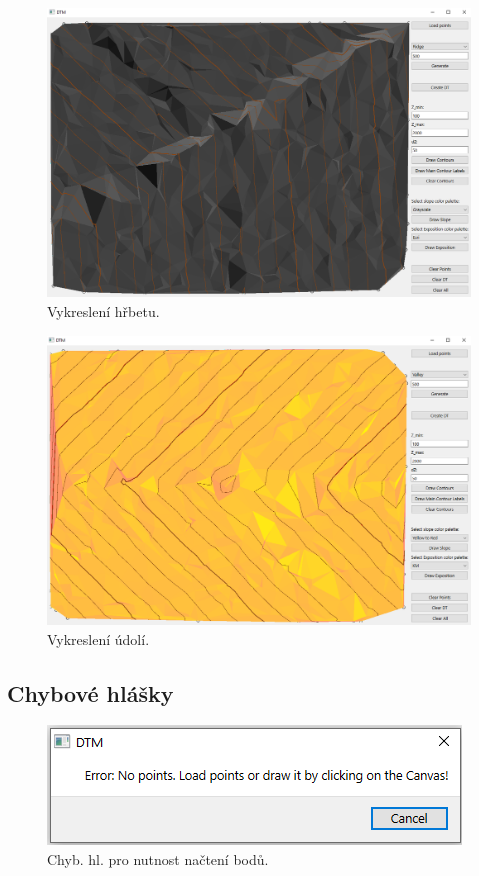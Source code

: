 \documentclass[a4paper, 12pt, oneside, titlepage]{article} %
\begin{document}
\begin{figure}[!htb]
	\centering
	\includegraphics[scale=0.45]{obrazky/hrbet.png} 
	\caption{Vykreslení hřbetu.
	}
	\label{fig:hrbet}
\end{figure} 
\FloatBarrier

\begin{figure}[!htb]
	\centering
	\includegraphics[scale=0.45]{obrazky/udoli.png} 
	\caption{Vykreslení údolí.
	}
	\label{fig:udoli}
\end{figure} 
\FloatBarrier

\subsection{Chybové hlášky}
\begin{figure}[!htb]
	\centering
	\includegraphics[scale=0.7]{obrazky/no_points.png} 
	\caption{Chyb. hl. pro nutnost načtení bodů.
	}
	\label{fig:no_points}
\end{figure} 
\FloatBarrier
\end{document}

